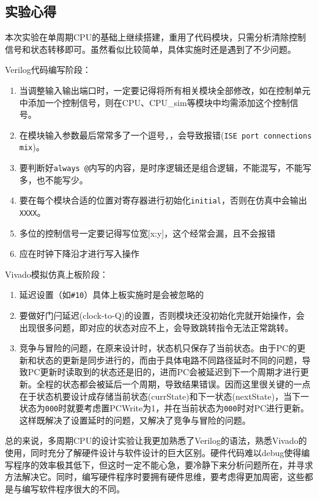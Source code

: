 \documentclass[12pt,UTF8]{ctexart}
\begin{document}
\begin{spacing}{1.1}
\section{实验心得}
\qquad 本次实验在单周期CPU的基础上继续搭建，重用了代码模块，只需分析清除控制信号和状态转移即可。虽然看似比较简单，具体实施时还是遇到了不少问题。
\par Verilog代码编写阶段：
\begin{enumerate}
    \item 当调整输入输出端口时，一定要记得将所有相关模块全部修改，如在控制单元中添加一个控制信号，则在CPU、CPU\_sim等模块中均需添加这个控制信号。
    \item 在模块输入参数最后常常多了一个逗号\verb','，会导致报错(\verb'ISE port connections mix')。
    \item 要判断好\verb'always @'内写的内容，是时序逻辑还是组合逻辑，不能混写，不能写多，也不能写少。
    \item 要在每个模块合适的位置对寄存器进行初始化\verb'initial'，否则在仿真中会输出\verb'XXXX'。
    \item 多位的控制信号一定要记得写位宽[x:y]，这个经常会漏，且不会报错
    \item 应在时钟下降沿才进行写入操作
\end{enumerate}
\par Vivado模拟仿真上板阶段：
\begin{enumerate}
    \item 延迟设置（如\verb'#10'）具体上板实施时是会被忽略的
    \item 要做好门闩延迟(clock-to-Q)的设置，否则模块还没初始化完就开始操作，会出现很多问题，即对应的状态对应不上，会导致跳转指令无法正常跳转。
    \item 竞争与冒险的问题，在原来设计时，状态机只保存了当前状态。由于PC的更新和状态的更新是同步进行的，而由于具体电路不同路径延时不同的问题，导致PC更新时读取到的状态还是旧的，进而PC会被延迟到下一个周期才进行更新。全程的状态都会被延后一个周期，导致结果错误。因而这里很关键的一点在于状态机要设计成存储当前状态(currState)和下一状态(nextState)，当下一状态为\verb'000'时就要考虑置PCWrite为1，并在当前状态为\verb'000'时对PC进行更新。这样既解决了设置延时的问题，又解决了竞争与冒险的问题。
\end{enumerate}
\par 总的来说，多周期CPU的设计实验让我更加熟悉了Verilog的语法，熟悉Vivado的使用，同时充分了解硬件设计与软件设计的巨大区别。硬件代码难以debug使得编写程序的效率极其低下，但这时一定不能心急，要冷静下来分析问题所在，并寻求方法解决它。同时，编写硬件程序时要拥有硬件思维，要考虑得更加周密，这些都是与编写软件程序很大的不同。



\end{spacing}
\end{document}
